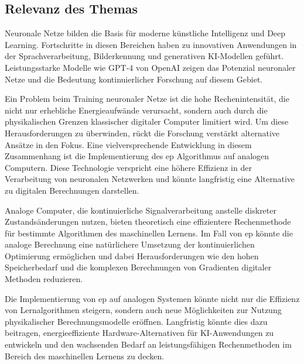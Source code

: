 \subsection{Relevanz des Themas}

Neuronale Netze bilden die Basis für moderne künstliche Intelligenz und Deep Learning. Fortschritte in diesen Bereichen haben zu innovativen Anwendungen in der Sprachverarbeitung, Bilderkennung und generativen KI-Modellen geführt. Leistungsstarke Modelle wie GPT-4 von OpenAI zeigen das Potenzial neuronaler Netze und die Bedeutung kontinuierlicher Forschung auf diesem Gebiet.

Ein Problem beim Training neuronaler Netze ist die hohe Rechenintensität, die nicht nur erhebliche Energieaufwände verursacht, sondern auch durch die physikalischen Grenzen klassischer digitaler Computer limitiert wird. Um diese Herausforderungen zu überwinden, rückt die Forschung verstärkt alternative Ansätze in den Fokus. Eine vielversprechende Entwicklung in diesem Zusammenhang ist die Implementierung des \ac{ep} Algorithmus auf analogen Computern. Diese Technologie verspricht eine höhere Effizienz in der Verarbeitung von neuronalen Netzwerken und könnte langfristig eine Alternative zu digitalen Berechnungen darstellen.

Analoge Computer, die kontinuierliche Signalverarbeitung anstelle diskreter Zustandsänderungen nutzen, bieten theoretisch eine effizientere Rechenmethode für bestimmte Algorithmen des maschinellen Lernens. Im Fall von \ac{ep} könnte die analoge Berechnung eine natürlichere Umsetzung der kontinuierlichen Optimierung ermöglichen und dabei Herausforderungen wie den hohen Speicherbedarf und die komplexen Berechnungen von Gradienten digitaler Methoden reduzieren.

Die Implementierung von \ac{ep} auf analogen Systemen könnte nicht nur die Effizienz von Lernalgorithmen steigern, sondern auch neue Möglichkeiten zur Nutzung physikalischer Berechnungsmodelle eröffnen. Langfristig könnte dies dazu beitragen, energieeffiziente Hardware-Alternativen für KI-Anwendungen zu entwickeln und den wachsenden Bedarf an leistungsfähigen Rechenmethoden im Bereich des maschinellen Lernens zu decken.
